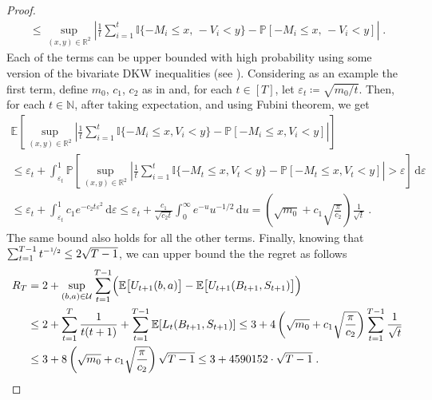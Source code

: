\documentclass[final,12pt]{colt2025}
\newcommand{\cU}{\mathcal{U}}
\newcommand{\E}{\mathbb{E}}
\newcommand{\N}{\mathbb{N}}
\newcommand{\Pb}{\mathbb{P}}
\newcommand{\bbR}{\mathbb{R}}
\newcommand{\e}{\varepsilon}
\newcommand{\lrb}[1]{\left(#1\right)}
\newcommand{\Brb}[1]{\Bigl(#1\Bigr)}
\newcommand{\lsb}[1]{\left[#1\right]}
\newcommand{\bsb}[1]{\bigl[#1\bigr]}
\newcommand{\one}[1]{\mathbb{I}\{#1\}}
\newcommand{\labs}[1]{\left\lvert#1\right\rvert}
\newcommand{\dif}{\,\mathrm{d}}
\newcommand{\Util}{U}
\newcommand{\nP}{M}
\newcommand{\nZ}{V}
\newcommand{\nb}{b}
\newcommand{\ns}{a}
\newcommand{\nc}{c}
\begin{document}
\begin{proof}
\begin{multline*}
    \le
        \sup_{(x,y)\in\bbR^2 }
        \labs{
                \frac{1}{t} \sum_{i=1}^t \one{ - \nP_i \le x, \, - \nZ_i < y }
                - \Pb[ - \nP_i \le x, \, - \nZ_i < y ]
            } \;.
    \end{multline*}
    Each of the terms can be upper bounded with high probability using some version of the bivariate DKW inequalities (see ).
    Considering as an example the first term, define $m_0$, $\nc_1$, $c_2$ as in  and, for each $t \in [T]$, let $\e_t \coloneq \sqrt{m_0/t}$.
    Then, for each $t \in \N$, after taking expectation, and using Fubini theorem, we get
    \begin{multline*}
        \E \lsb{
            \sup_{(x, y) \in \bbR^2}
            \left| \frac{1}{t} \sum_{i=1}^t \one{ -\nP_i \le x, \nZ_i < y }
            - \Pb[ -\nP_i \le x, \nZ_i < y ] \right|
        } \\
    \le
        \e_t + \int_{\e_t}^1
            \Pb \lsb{
                \sup_{(x, y) \in \bbR^2} \left|
                    \frac{1}{t} \sum_{i=1}^t \one{ -\nP_t \le x, \nZ_t < y } - \Pb[ -\nP_t \le x, \nZ_t < y ]
                \right| > \e
            } \dif \e \\
    \le
        \e_t + \int_{\e_t}^1 \nc_1 e^{-c_2 t \e^2} \dif \e
    \le
        \e_t + \frac{c_1}{\sqrt{c_2 t}} \int_{0}^{\infty} e^{-u}u^{-1/2} \dif u
    =
        \lrb{ \sqrt{m_0} + \nc_1 \sqrt{\frac{\pi}{c_2}}} \frac{1}{\sqrt{t} }\;.
    \end{multline*}
    The same bound also holds for all the other terms.
    Finally, knowing that $\sum_{t=1}^{T-1} t^{-\nicefrac{1}{2}} \le 2\sqrt{T - 1}$, we can upper bound the the regret as follows
    \begin{align*}
        R_T
    &=
        2 + \sup_{(\nb,\ns) \in \cU}\sum_{t=1}^{T-1} \Brb{\E\bsb{\Util_{t+1}(\nb, \ns)} - \E\bsb{\Util_{t+1}(B_{t+1}, S_{t+1})}}
    \\
    &\le
        2 + \sum_{t=1}^T \frac{1}{t(t+1)} + \sum_{t=1}^{T-1} \E[L_t(B_{t+1}, S_{t+1})]
    \le
        3 + 4 \lrb{ \sqrt{m_0} + \nc_1 \sqrt{\frac{\pi}{c_2}}} \sum_{t=1}^{T-1} \frac{1}{\sqrt{t}}
    \\
    &\le
        3 + 8 \lrb{ \sqrt{m_0} + \nc_1 \sqrt{\frac{\pi}{c_2}}} \sqrt{T - 1}
    \le
        3 + 4590152 \cdot \sqrt{T - 1} \;.
    \end{align*}
\end{proof}
\end{document}
